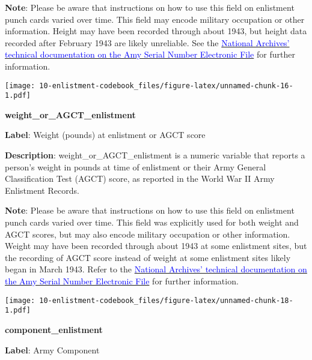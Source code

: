 \documentclass[
]{article}
\begin{document}
\textbf{Note}: Please be aware that instructions on how to use this
field on enlistment punch cards varied over time. This field may encode
military occupation or other information. Height may have been recorded
through about 1943, but height data recorded after February 1943 are
likely unreliable. See the
\href{https://catalog.archives.gov/OpaAPI/media/1263923/content/arcmedia/electronic-records/rg-064/asnf/100.1ND_NC.pdf?download=false}{\textcolor{blue}{National Archives' technical documentation on the Amy Serial Number Electronic File}}
for further information.

\vspace{75pt}

\texttt{[image: 10-enlistment-codebook\_files/figure-latex/unnamed-chunk-16-1.pdf]}

\newpage

\textbf{\huge weight\_or\_AGCT\_enlistment} \normalsize \vspace{12pt}

\textbf{Label}: Weight (pounds) at enlistment or AGCT score

\textbf{Description}: weight\_or\_AGCT\_enlistment is a numeric variable
that reports a person's weight in pounds at time of enlistment or their
Army General Classification Test (AGCT) score, as reported in the World
War II Army Enlistment Records.

\textbf{Note}: Please be aware that instructions on how to use this
field on enlistment punch cards varied over time. This field was
explicitly used for both weight and AGCT scores, but may also encode
military occupation or other information. Weight may have been recorded
through about 1943 at some enlistment sites, but the recording of AGCT
score instead of weight at some enlistment sites likely began in March
1943. Refer to the
\href{https://catalog.archives.gov/OpaAPI/media/1263923/content/arcmedia/electronic-records/rg-064/asnf/100.1ND_NC.pdf?download=false}{\textcolor{blue}{National Archives' technical documentation on the Amy Serial Number Electronic File}}
for further information.

\vspace{75pt}

\texttt{[image: 10-enlistment-codebook\_files/figure-latex/unnamed-chunk-18-1.pdf]}

\newpage

\textbf{\huge component\_enlistment} \normalsize \vspace{12pt}

\textbf{Label}: Army Component
\end{document}
